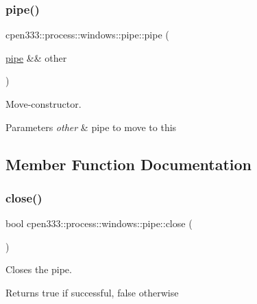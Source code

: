 \subsubsection{\texorpdfstring{pipe()}{pipe()}\hspace{0.1cm}{\footnotesize\ttfamily [2/2]}}
{\footnotesize\ttfamily cpen333\+::process\+::windows\+::pipe\+::pipe (\begin{DoxyParamCaption}\item[{\hyperlink{classcpen333_1_1process_1_1windows_1_1pipe}{pipe} \&\&}]{other }\end{DoxyParamCaption})\hspace{0.3cm}{\ttfamily [inline]}}



Move-\/constructor. 


\begin{DoxyParams}{Parameters}
{\em other} & pipe to move to this \\
\hline
\end{DoxyParams}


\subsection{Member Function Documentation}
\mbox{\label{classcpen333_1_1process_1_1windows_1_1pipe_a6d01b3a84c6184ba02e9825003386d20}} 
\subsubsection{\texorpdfstring{close()}{close()}}
{\footnotesize\ttfamily bool cpen333\+::process\+::windows\+::pipe\+::close (\begin{DoxyParamCaption}{ }\end{DoxyParamCaption})\hspace{0.3cm}{\ttfamily [inline]}}



Closes the pipe. 

\begin{DoxyReturn}{Returns}
true if successful, false otherwise 
\end{DoxyReturn}
\mbox{\label{classcpen333_1_1process_1_1windows_1_1pipe_a25b30161d315cfd4ad1b9fdaf55d56b0}} 
